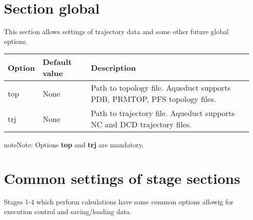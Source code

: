 \documentclass[a4paper,10pt,english]{sphinxmanual}
\begin{document}
\section{Section \textbf{global}}
\label{valve/valve_config:section-global}
This section allows settings of trajectory data and some other future global options.

\begin{tabulary}{\linewidth}{|L|L|L|}
\hline
\textsf{\relax 
Option
} & \textsf{\relax 
Default value
} & \textsf{\relax 
Description
}\\
\hline
top
 & 
None
 & 
Path to topology file. Aqueduct supports PDB, PRMTOP, PFS topology files.
\\
\hline
trj
 & 
None
 & 
Path to trajectory file. Aqueduct supports NC and DCD trajectory files.
\\
\hline\end{tabulary}


\begin{notice}{note}{Note:}
Options \textbf{top} and \textbf{trj} are mandatory.
\end{notice}


\section{Common settings of stage sections}
\label{valve/valve_config:common-settings-of-stage-sections}
Stages 1-4 which perform calsulations have some common options allowig for execution control and saving/loading data.
\end{document}
